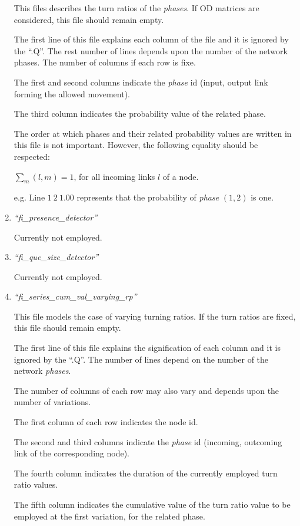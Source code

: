 \documentclass[10pt, conference, compsocconf]{IEEEtran}
\begin{document}
\begin{enumerate}
This files describes the  turn ratios of the  \emph{phases}. 
If OD matrices are considered, this file should remain empty. 

The first line of this file explains each column of the file and it is ignored by the ``.Q''.
The rest number of lines depends upon the number of the network phases.
The number of columns if each row is fixe.

The first and second columns indicate the \emph{phase} id (input, output link forming the allowed movement).

The third column indicates the probability value of the related phase. 

The order at which phases and their related probability values are written in this file is not important.
However, the following equality should be respected:

$\displaystyle\sum_{m}(l,m)=1$, for all incoming links $l$ of a  node.

e.g. Line $1 \	 2	\ 1.00	$  represents that the  probability of \emph{phase} $(1,2)$ is one.

\item \emph{``fi\_presence\_detector''}

Currently not employed.


\item \emph{``fi\_que\_size\_detector''}

Currently not employed.





\item \emph{``fi\_series\_cum\_val\_varying\_rp''}

This file models the case of varying turning ratios. 
If the turn ratios are fixed, this file should remain empty.

The first line of this file explains the signification of each column  and it is ignored by the ``.Q''.
The number of lines depend on the number of the network \emph{phases}.

The number of columns of each row may also vary and depends upon the number of variations. 

The first column of each  row indicates the node id.

The second and third  columns indicate the \emph{phase} id (incoming, outcoming link of the corresponding node).

The fourth column indicates the duration of the currently employed turn ratio values.

The fifth column indicates the cumulative value of the turn ratio value to be employed at the first variation, for the related phase. 


\end{enumerate}
\end{document}
